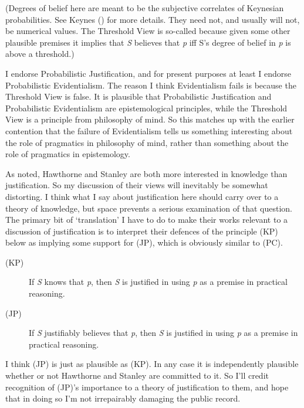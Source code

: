\documentclass[
  10pt,
  letterpaper,
  DIV=11,
  numbers=noendperiod,
  twoside]{scrartcl}
\begin{document}
(Degrees of belief here are meant to be the subjective correlates of
Keynesian probabilities. See Keynes ()
for more details. They need not, and usually will not, be numerical
values. The Threshold View is so-called because given some other
plausible premises it implies that \emph{S} believes that \emph{p} iff
S's degree of belief in \emph{p} is above a threshold.)

I endorse Probabilistic Justification, and for present purposes at least
I endorse Probabilistic Evidentialism. The reason I think Evidentialism
fails is because the Threshold View is false. It is plausible that
Probabilistic Justification and Probabilistic Evidentialism are
epistemological principles, while the Threshold View is a principle from
philosophy of mind. So this matches up with the earlier contention that
the failure of Evidentialism tells us something interesting about the
role of pragmatics in philosophy of mind, rather than something about
the role of pragmatics in epistemology.

As noted, Hawthorne and Stanley are both more interested in knowledge
than justification. So my discussion of their views will inevitably be
somewhat distorting. I think what I say about justification here should
carry over to a theory of knowledge, but space prevents a serious
examination of that question. The primary bit of `translation' I have to
do to make their works relevant to a discussion of justification is to
interpret their defences of the principle (KP) below as implying some
support for (JP), which is obviously similar to (PC).

\begin{description}
\item[(KP)]
If \emph{S} knows that \emph{p}, then \emph{S} is justified in using
\emph{p} as a premise in practical reasoning.
\item[(JP)]
If \emph{S} justifiably believes that \emph{p}, then \emph{S} is
justified in using \emph{p} as a premise in practical reasoning.
\end{description}

I think (JP) is just as plausible as (KP). In any case it is
independently plausible whether or not Hawthorne and Stanley are
committed to it. So I'll credit recognition of (JP)'s importance to a
theory of justification to them, and hope that in doing so I'm not
irrepairably damaging the public record.
\end{document}
